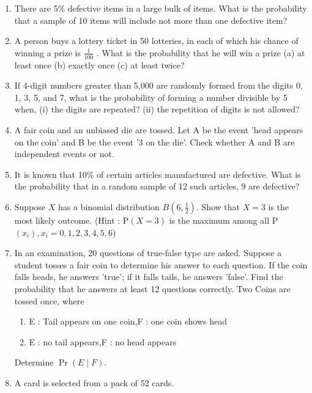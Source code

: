 \providecommand{\pr}[1]{\ensuremath{\Pr\left(#1\right)}}
\providecommand{\brak}[1]{\ensuremath{\left(#1\right)}}
\begin{enumerate}[label=\thechapter.\arabic*,ref=\thechapter.\theenumi]
\item There are 5\% defective items in a large bulk of items. What is the probability
that a sample of 10 items will include not more than one defective item?
\item A person buys a lottery ticket in 50 lotteries, in each of which his chance of
winning a prize is $\frac{1}{100}$ . What is the probability that he will win a prize
(a) at least once (b) exactly once (c) at least twice?
\item If 4-digit numbers greater than 5,000 are randomly formed from the digits
0, 1, 3, 5, and 7, what is the probability of forming a number divisible by 5 when,
(i) the digits are repeated? (ii) the repetition of digits is not allowed?
\item A fair coin and an unbiased die are tossed. Let A be the event 'head appears on the coin' and B be the event '3 on the die'. Check whether A and B are independent events or not.
\item It is known that 10\% of certain articles manufactured are defective. What is the probability that in a random sample of 12 such articles, 9 are defective?
\item Suppose $X$ has a binomial distribution $B\brak{6,\frac{1}{2}}$. Show that $X = 3$ is the most likely outcome. 
(Hint : P$\brak{X = 3}$ is the maximum among all P$\brak{x_i}, x_i = 0,1,2,3,4,5,6$)
\item In an examination, 20 questions of true-false type are asked. Suppose a student
	tosses a fair coin to determine his answer to each question. If the coin falls
	heads, he answers 'true'; if it falls tails, he answers 'false'. Find the probability
	that he answers at least 12 questions correctly.
Two Coins are tossed once, where
\begin{enumerate}
\item  E : Tail appears on one coin,\qquad F : one coin shows head
\item  E : no tail appears,\qquad\qquad\qquad F : no head appears
\end{enumerate}
Determine \pr{E\mid F}.
\item A card is selected from a pack of 52 cards.
\begin{enumerate}

\end{enumerate}
\end{enumerate}
